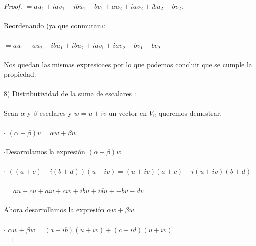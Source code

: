 \documentclass[11pt]{article}
\theoremstyle{definition} %
\begin{document}
\begin{proof}
$= au_1 + iav_1 + ibu_1 -bv_1 + au_2 + iav_2 + ibu_2 - bv_2$.\\

\\

Reordenando (ya que conmutan):\\

\\

$= au_1 + au_2 + ibu_1 + ibu_2 + iav_1 + iav_2 -bv_1 -bv_2$\\

\\

Nos quedan las mismas expresiones por lo que podemos concluir que se cumple la propiedad.\\

\\

8) Distributividad de la suma de escalares : \\

\\

Sean $\alpha$ y $\beta$ escalares y $w = u +iv$ un vector en $V_\mathbb{C}$ queremos demostrar.\\

\\

$\cdot$ $(\alpha + \beta)v = \alpha w + \beta w$\\

\\

$\cdot$Desarrolamos la expresión $(\alpha + \beta)w$ \\

\\

$\cdot$ $((a + c) + i(b + d))(u + iv) = (u+iv)(a+c) + i(u+ iv)(b+d)$\\

\\

$= au + cu + aiv + civ + ibu + idu + - bv - dv$\\

\\

Ahora desarrollamos la expresión $\alpha w + \beta w$\\

\\

$\cdot$ $\alpha w+ \beta w = (a + ib)(u +iv) + (c + id)(u + iv)$\\


\end{proof}
\end{document}
